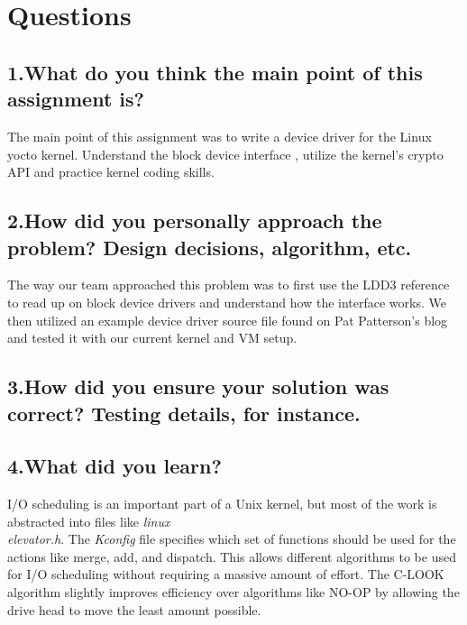 \documentclass[letterpaper,10pt,fleqn]{article}
\begin{document}
	\section*{Questions}
	\subsection*{1.What do you think the main point of this assignment is?}
	The main point of this assignment was to write a device driver for the Linux yocto kernel.
	Understand the block device interface , utilize the kernel's crypto API and practice kernel
	coding skills.

	\subsection*{2.How did you personally approach the problem? Design decisions, algorithm, etc.}
	The way our team approached this problem was to first use the LDD3 reference to read up on block device drivers and understand how the interface works. We then utilized an example device driver source file found on Pat Patterson's blog and tested it with our current kernel and VM setup. 

	\subsection*{3.How did you ensure your solution was correct? Testing details, for instance.}
	

	\subsection*{4.What did you learn?}
	I/O scheduling is an important part of a Unix kernel, but most of the work is abstracted into files like \textit{linux\\elevator.h}.
	The \textit{Kconfig} file specifies which set of functions should be used for the actions like merge, add, and dispatch.
	This allows different algorithms to be used for I/O scheduling without requiring a massive amount of effort.
	The C-LOOK algorithm slightly improves efficiency over algorithms like NO-OP by allowing the drive head to move the least amount possible.
\end{document}
